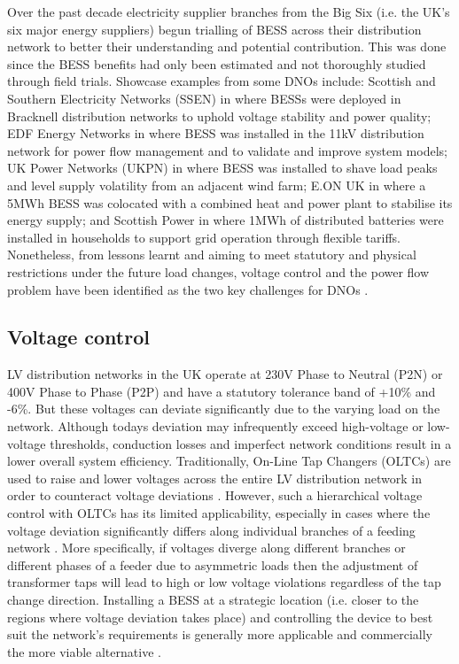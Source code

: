 Over the past decade electricity supplier branches from the Big Six (i.e. the UK's six major energy suppliers) begun trialling of BESS across their distribution network to better their understanding and potential contribution.
This was done since the BESS benefits had only been estimated and not thoroughly studied through field trials.
Showcase examples from some DNOs include:
Scottish and Southern Electricity Networks (SSEN) in \cite{NTVV2016} where BESSs were deployed in Bracknell distribution networks to uphold voltage stability and power quality;
EDF Energy Networks in \cite{Wade2010} where BESS was installed in the 11kV distribution network for power flow management and to validate and improve system models;
UK Power Networks (UKPN) in \cite{Lyons2015a} where BESS was installed to shave load peaks and level supply volatility from an adjacent wind farm;
E.ON UK in \cite{EON2017} where a 5MWh BESS was colocated with a combined heat and power plant to stabilise its energy supply;
and Scottish Power in \cite{ScottishPower2016} where 1MWh of distributed batteries were installed in households to support grid operation through flexible tariffs.
Nonetheless, from lessons learnt and aiming to meet statutory and physical restrictions under the future load changes, voltage control and the power flow problem have been identified as the two key challenges for DNOs \cite{Ferreira2013a, Shi2015}.

\subsection{Voltage control}
\label{ch-literature:subsec:voltage-control}

LV distribution networks in the UK operate at 230V Phase to Neutral (P2N) or 400V Phase to Phase (P2P) and have a statutory tolerance band of +10\% and -6\%.
But these voltages can deviate significantly due to the varying load on the network.
Although todays deviation may infrequently exceed high-voltage or low-voltage thresholds, conduction losses and imperfect network conditions result in a lower overall system efficiency.
Traditionally, On-Line Tap Changers (OLTCs) are used to raise and lower voltages across the entire LV distribution network in order to counteract voltage deviations \cite{Sun2009}.
However, such a hierarchical voltage control with OLTCs has its limited applicability, especially in cases where the voltage deviation significantly differs along individual branches of a feeding network \cite{Zangs2016}.
More specifically, if voltages diverge along different branches or different phases of a feeder due to asymmetric loads then the adjustment of transformer taps will lead to high or low voltage violations regardless of the tap change direction.
Installing a BESS at a strategic location (i.e. closer to the regions where voltage deviation takes place) and controlling the device to best suit the network's requirements is generally more applicable and commercially the more viable alternative \cite{Liserre2010}.

